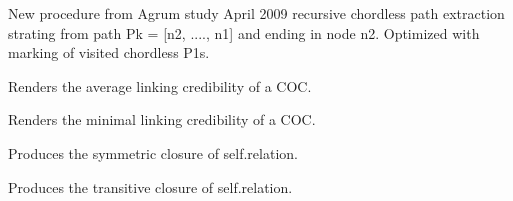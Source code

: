 \documentclass[letterpaper,10pt,english]{sphinxmanual}
\begin{document}
\begin{fulllineitems}
\begin{fulllineitems}
\end{fulllineitems}


\begin{fulllineitems}
\label{techDoc:digraphs.Digraph.chordlessPaths}
New procedure from Agrum study April 2009
recursive chordless path extraction strating from path
Pk = {[}n2, ...., n1{]} and ending in node n2.
Optimized with marking of visited chordless P1s.

\end{fulllineitems}


\begin{fulllineitems}
\label{techDoc:digraphs.Digraph.circuitAverageCredibility}
Renders the average linking credibility of a COC.

\end{fulllineitems}


\begin{fulllineitems}
\label{techDoc:digraphs.Digraph.circuitMinCredibility}
Renders the minimal linking credibility of a COC.

\end{fulllineitems}


\begin{fulllineitems}
\label{techDoc:digraphs.Digraph.closeSymmetric}
Produces the symmetric closure of self.relation.

\end{fulllineitems}


\begin{fulllineitems}
\label{techDoc:digraphs.Digraph.closeTransitive}
Produces the transitive closure of self.relation.


\end{fulllineitems}
\end{fulllineitems}
\end{document}
